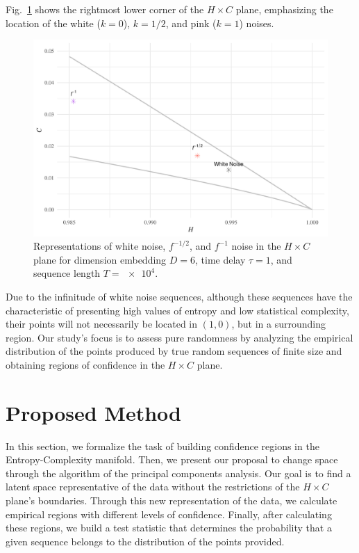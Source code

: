 \documentclass[alpha-refs]{wiley-article}
\begin{document}
Fig.~\ref{fig:RightMostCorner} shows the rightmost lower corner of the $H\times C$ plane, emphasizing the location of the white ($k=0$), $k=1/2$, and pink ($k=1$) noises.

\begin{figure}[hbt]
	\centering
	\includegraphics[width=\linewidth]{RightMostCorner}
	\caption{Representations of white noise, $f^{-1/2}$, and $f^{-1}$ noise in the $H \times C$ plane  for dimension embedding $D = 6$, time delay $\tau = 1$, and sequence length $T = \num[scientific-notation=true]{e4}$.}
	\label{fig:RightMostCorner}
\end{figure}

Due to the infinitude of white noise sequences, although these sequences have the characteristic of presenting high values of entropy and low statistical complexity, their points will not necessarily be located in $(1, 0)$, but in a surrounding region.
Our study's focus is to assess pure randomness by analyzing the empirical distribution of the points produced by true random sequences of finite size and obtaining regions of confidence in the $H \times C$ plane.

\section{Proposed Method}\label{Sec:Proposal}

In this section, we formalize the task of building confidence regions in the Entropy-Complexity manifold.
Then, we present our proposal to change space through the algorithm of the principal components analysis.
Our goal is to find a latent space representative of the data without the restrictions of the $H\times C$ plane's boundaries.
Through this new representation of the data, we calculate empirical regions with different levels of confidence.
Finally, after calculating these regions, we build a test statistic that determines the probability that a given sequence belongs to the distribution of the points provided.
\end{document}
